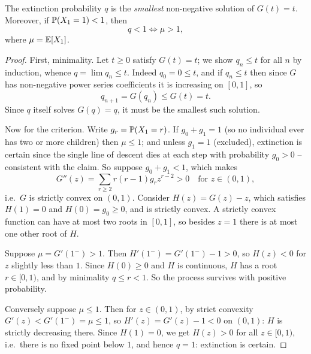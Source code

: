 \documentclass[a4paper]{scrartcl}
\begin{document}
\begin{center}
\end{center}

\begin{theorem}
	The extinction probability $q$ is the \emph{smallest} non-negative solution of $G(t) = t$. Moreover, if $\mathbb{P}(X_1 = 1) < 1$, then
	$$
	q < 1 \iff \mu > 1,
	$$
	where $\mu = \mathbb{E}[X_1]$.
\end{theorem}
\begin{proof}
	First, minimality. Let $t \geq 0$ satisfy $G(t) = t$; we show $q_n \leq t$ for all $n$ by induction, whence $q = \lim q_n \leq t$. Indeed $q_0 = 0 \leq t$, and if $q_n \leq t$ then since $G$ has non-negative power series coefficients it is increasing on $[0, 1]$, so
	$$
	q_{n + 1} = G(q_n) \leq G(t) = t.
	$$
	Since $q$ itself solves $G(q) = q$, it must be the smallest such solution.

	Now for the criterion. Write $g_r = \mathbb{P}(X_1 = r)$. If $g_0 + g_1 = 1$ (so no individual ever has two or more children) then $\mu \leq 1$; and unless $g_1 = 1$ (excluded), extinction is certain since the single line of descent dies at each step with probability $g_0 > 0$ -- consistent with the claim. So suppose $g_0 + g_1 < 1$, which makes
	$$
	G''(z) = \sum_{r \geq 2} r(r - 1)g_r z^{r - 2} > 0 \quad \text{for } z \in (0, 1),
	$$
	i.e.\ $G$ is strictly convex on $(0, 1)$. Consider $H(z) = G(z) - z$, which satisfies $H(1) = 0$ and $H(0) = g_0 \geq 0$, and is strictly convex. A strictly convex function can have at most two roots in $[0,1]$, so besides $z = 1$ there is at most one other root of $H$.

	Suppose $\mu = G'(1^-) > 1$. Then $H'(1^-) = G'(1^-) - 1 > 0$, so $H(z) < 0$ for $z$ slightly less than $1$. Since $H(0) \geq 0$ and $H$ is continuous, $H$ has a root $r \in [0, 1)$, and by minimality $q \leq r < 1$. So the process survives with positive probability.

	Conversely suppose $\mu \leq 1$. Then for $z \in (0,1)$, by strict convexity $G'(z) < G'(1^-) = \mu \leq 1$, so $H'(z) = G'(z) - 1 < 0$ on $(0, 1)$: $H$ is strictly decreasing there. Since $H(1) = 0$, we get $H(z) > 0$ for all $z \in [0, 1)$, i.e.\ there is no fixed point below $1$, and hence $q = 1$: extinction is certain.
\end{proof}
\end{document}
